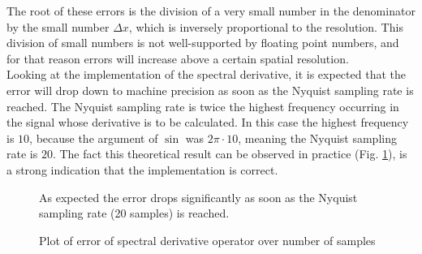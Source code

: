 The root of these errors is the division of a very small number in the denominator by the small number $\Delta x$, which is inversely proportional to the resolution.
This division of small numbers is not well-supported by floating point numbers, and for that reason errors will increase above a certain spatial resolution.\\
Looking at the implementation of the spectral derivative, it is expected that the error will drop down to machine precision as soon as the Nyquist sampling rate is reached.
The Nyquist sampling rate is twice the highest frequency occurring in the signal whose derivative is to be calculated.
In this case the highest frequency is $10$, because the argument of $\sin$ was $2\pi\cdot 10$, meaning the Nyquist sampling rate is $20$.
The fact this theoretical result can be observed in practice (Fig. \ref{fig:fft_error}), is a strong indication that the implementation is correct.

\begin{figure}[!h]
    \caption{Plot of error of spectral derivative operator over number of samples}
    \label{fig:fft_error}
    \small
    As expected the error drops significantly as soon as the Nyquist sampling rate (20 samples) is reached.
\end{figure}


